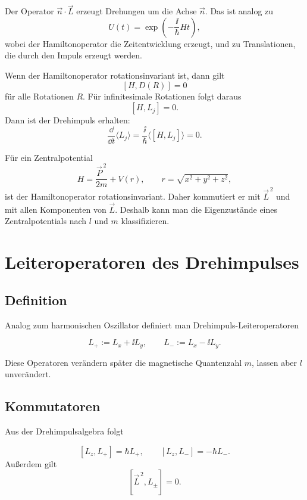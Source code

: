 \begin{conceptbox}
Der Operator \(\vec n\cdot\vec L\) erzeugt Drehungen um die Achse \(\vec n\). Das ist analog zu
\[
    U(t)=\exp\left(-\frac{\ii}{\hbar}Ht\right),
\]
wobei der Hamiltonoperator die Zeitentwicklung erzeugt, und zu Translationen, die durch den Impuls erzeugt werden.
\end{conceptbox}

Wenn der Hamiltonoperator rotationsinvariant ist, dann gilt
\[
    [H,D(R)]=0
\]
für alle Rotationen \(R\). Für infinitesimale Rotationen folgt daraus
\[
    [H,L_j]=0.
\]
Dann ist der Drehimpuls erhalten:
\[
    \frac{\dd}{\dd t}\langle L_j\rangle
    =\frac{\ii}{\hbar}\langle[H,L_j]\rangle=0.
\]

\begin{examplebox}
Für ein Zentralpotential
\[
    H=\frac{\vec P^{\,2}}{2m}+V(r),
    \qquad r=\sqrt{x^2+y^2+z^2},
\]
ist der Hamiltonoperator rotationsinvariant. Daher kommutiert er mit \(\vec L^{\,2}\) und mit allen Komponenten von \(\vec L\). Deshalb kann man die Eigenzustände eines Zentralpotentials nach \(l\) und \(m\) klassifizieren.
\end{examplebox}

\section{Leiteroperatoren des Drehimpulses}

\subsection{Definition}

Analog zum harmonischen Oszillator definiert man Drehimpuls-Leiteroperatoren
\begin{definitionbox}
\[
    L_+ := L_x+\ii L_y,
    \qquad
    L_- := L_x-\ii L_y.
\]
\end{definitionbox}

Diese Operatoren verändern später die magnetische Quantenzahl \(m\), lassen aber \(l\) unverändert.

\subsection{Kommutatoren}

Aus der Drehimpulsalgebra folgt
\begin{formulabox}
\[
    [L_z,L_+]=\hbar L_+,
    \qquad
    [L_z,L_-]=-\hbar L_-.
\]
Außerdem gilt
\[
    [\vec L^{\,2},L_\pm]=0.
\]
\end{formulabox}

